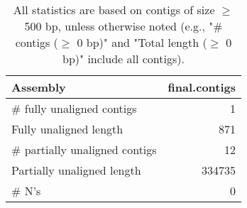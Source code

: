 \documentclass[12pt,a4paper]{article}
\begin{document}
\begin{table}[ht]
\begin{center}
\caption{All statistics are based on contigs of size $\geq$ 500 bp, unless otherwise noted (e.g., "\# contigs ($\geq$ 0 bp)" and "Total length ($\geq$ 0 bp)" include all contigs).}
\begin{tabular}{|l*{1}{|r}|}
\hline
Assembly & final.contigs \\ \hline
\# fully unaligned contigs & 1 \\ \hline
Fully unaligned length & 871 \\ \hline
\# partially unaligned contigs & 12 \\ \hline
Partially unaligned length & 334735 \\ \hline
\# N's & 0 \\ \hline
\end{tabular}
\end{center}
\end{table}
\end{document}
